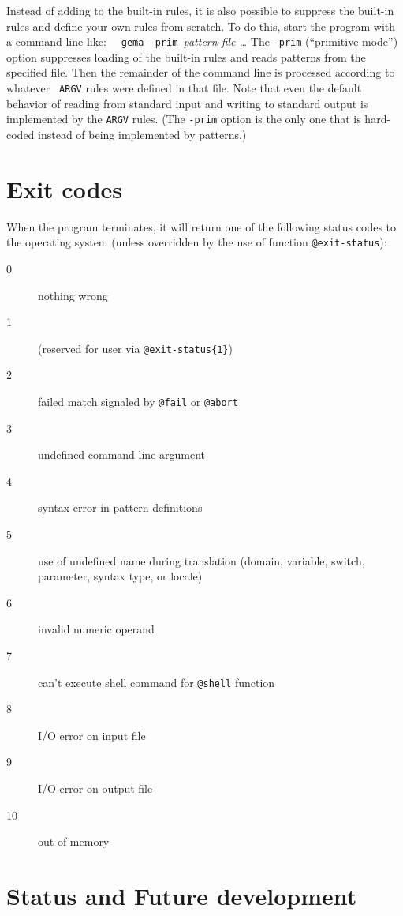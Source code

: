 Instead of adding to the built-in rules, it is also possible to suppress
the built-in rules and define your own rules from scratch.  To do this,
start the program with a command line like:\newline
\verb|  gema -prim |{\em pattern-file  \ldots}
\newline
The \verb/-prim/ (``primitive mode'') option suppresses loading of the
built-in rules and reads patterns from the specified file.  Then the
remainder of the command line is processed according to whatever {\tt
ARGV} rules were defined in that file.
Note that even the default behavior of reading from standard input and
writing to standard output is implemented by the {\tt ARGV} rules.
(The \verb/-prim/ option is the only one that is hard-coded instead of
being implemented by patterns.)

\pagebreak[4]
\section{Exit codes}
When the program terminates, it will return one of the following status
codes to the operating system (unless overridden by the use of function
\verb/@exit-status/): 
\begin{description}
\item[0]  nothing wrong 
\item[1]  (reserved for user via \verb/@exit-status{1}/)
\item[2]  failed match signaled by \verb/@fail/ or \verb/@abort/ 
\item[3]  undefined command line argument 
\item[4]  syntax error in pattern definitions 
\item[5]  use of undefined name during translation
	   (domain, variable, switch, parameter, syntax type, or locale) 
\item[6]  invalid numeric operand 
\item[7]  can't execute shell command for \verb/@shell/ function
\item[8]  I/O error on input file 
\item[9]  I/O error on output file 
\item[10] out of memory 
\end{description}

\pagebreak[4]
\section{Status and Future development}

